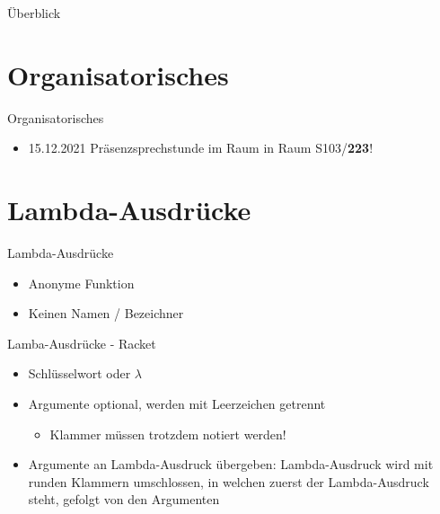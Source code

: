\documentclass{../tuda-beamer}
\date{08. Dezember 2021}
\begin{document}
    \maketitle

    \begin{frame}{Überblick}
        \tableofcontents
    \end{frame}


    \section{Organisatorisches}
    \begin{frame}{Organisatorisches}
        \begin{itemize}
            \item 15.12.2021 Präsenzsprechstunde im Raum in Raum S103/\textbf{223}!
        \end{itemize}
    \end{frame}


    \section{Lambda-Ausdrücke}
    \begin{frame}{Lambda-Ausdrücke}
        \begin{itemize}
            \item Anonyme Funktion
            \item Keinen Namen / Bezeichner
        \end{itemize}
    \end{frame}

    \begin{frame}{Lamba-Ausdrücke - Racket}
        \begin{itemize}
            \item Schlüsselwort  oder \textcolor{keywordcolor}{\(\lambda\)}
            \item Argumente optional, werden mit Leerzeichen getrennt
            \begin{itemize}
                \item Klammer müssen trotzdem notiert werden!
            \end{itemize}
            \item Argumente an Lambda-Ausdruck übergeben: Lambda-Ausdruck wird mit runden Klammern
            umschlossen, in welchen zuerst der Lambda-Ausdruck steht, gefolgt von den Argumenten
        \end{itemize}
        
    \end{frame}
\end{document}
